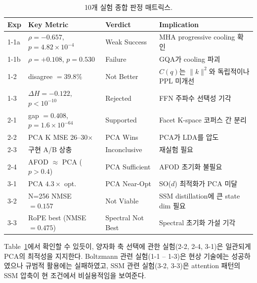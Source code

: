 \documentclass[11pt,a4paper]{article}
\newcommand{\Cq}{C(q)}
\newcommand{\knorm}{\|k\|^2}
\begin{document}
\begin{table}[H]
\centering
\caption{10개 실험 종합 판정 매트릭스.}
\label{tab:exec_verdict}
\small
\begin{tabularx}{\textwidth}{@{}ll>{\raggedright\arraybackslash}p{2.2cm}>{\raggedright\arraybackslash}X@{}}
\toprule
\textbf{Exp} & \textbf{Key Metric} & \textbf{Verdict} & \textbf{Implication} \\
\midrule
1-1a & $\rho = -0.657$, $p = 4.82 \times 10^{-4}$ & \textcolor{partial}{Weak Success} & MHA progressive cooling 확인 \\
1-1b & $\rho = +0.108$, $p = 0.530$ & \textcolor{failure}{Failure} & GQA가 cooling 파괴 \\
1-2 & disagree $= 39.8\%$ & \textcolor{partial}{Not Better} & $\Cq$는 $\knorm$와 독립적이나 PPL 미개선 \\
1-3 & $\Delta H = -0.122$, $p < 10^{-10}$ & \textcolor{failure}{Rejected} & FFN 주파수 선택성 기각 \\
2-1 & gap $= 0.408$, $p = 1.6 \times 10^{-64}$ & \textcolor{success}{Supported} & Facet K-space 코퍼스 간 분리 \\
2-2 & PCA K MSE 26--30$\times$ & \textcolor{success}{PCA Wins} & PCA가 LDA를 압도 \\
2-3 & 구현 A/B 상충 & \textcolor{inconclusive}{Inconclusive} & 재실험 필요 \\
2-4 & AFOD $\approx$ PCA ($p > 0.4$) & \textcolor{success}{PCA Sufficient} & AFOD 초기화 불필요 \\
3-1 & PCA $4.3\times$ opt. & \textcolor{success}{PCA Near-Opt} & SO($d$) 최적화가 PCA 미달 \\
3-2 & N=256 NMSE $= 0.157$ & \textcolor{failure}{Not Viable} & SSM distillation에 큰 state dim 필요 \\
3-3 & RoPE best (NMSE $= 0.475$) & \textcolor{failure}{Spectral Not Best} & Spectral 초기화 가설 기각 \\
\bottomrule
\end{tabularx}
\end{table}

Table~\ref{tab:exec_verdict}에서 확인할 수 있듯이, 양자화 축 선택에 관한 실험(2-2, 2-4, 3-1)은 일관되게 PCA의 최적성을 지지한다.
Boltzmann 관련 실험(1-1 -- 1-3)은 현상 기술에는 성공하였으나 규범적 활용에는 실패하였고, SSM 관련 실험(3-2, 3-3)은 attention 패턴의 SSM 압축이 현 조건에서 비실용적임을 보여준다.

\end{document}
